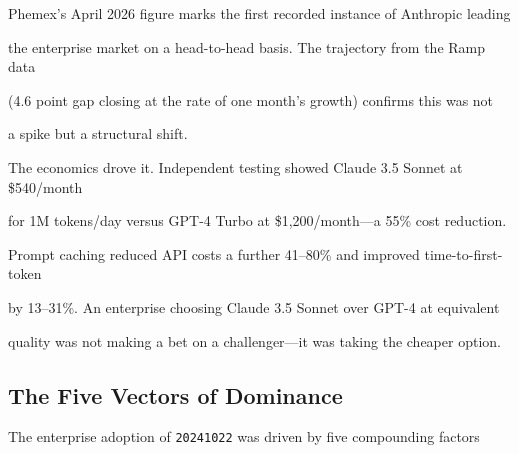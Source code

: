 \documentclass[11pt]{article}
\theoremstyle{definition}
\begin{document}
Phemex's April 2026 figure marks the first recorded instance of Anthropic leading





the enterprise market on a head-to-head basis. The trajectory from the Ramp data





(4.6 point gap closing at the rate of one month's growth) confirms this was not





a spike but a structural shift.











The economics drove it. Independent testing showed Claude 3.5 Sonnet at \$540/month





for 1M tokens/day versus GPT-4 Turbo at \$1,200/month---a 55\% cost reduction.





Prompt caching reduced API costs a further 41--80\% and improved time-to-first-token





by 13--31\%. An enterprise choosing Claude 3.5 Sonnet over GPT-4 at equivalent





quality was not making a bet on a challenger---it was taking the cheaper option.











\subsection{The Five Vectors of Dominance}











The enterprise adoption of \texttt{20241022} was driven by five compounding factors
\end{document}
